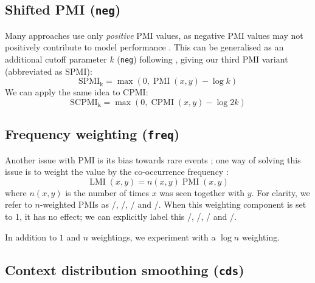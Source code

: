 \documentclass[11pt]{article}
\begin{document}


\subsection{Shifted PMI (\texttt{neg})}
\label{sec:shifted-pmi}

Many approaches use only \emph{positive} PMI values, as  negative PMI values may not positively contribute to model performance \cite{Turney:2010:FMV:1861751.1861756}. This can be generalised as an additional cutoff parameter $k$ (\texttt{neg}) following , giving our third PMI variant (abbreviated as SPMI):
%
\begin{equation}
  \label{eq:ppmi}
  \operatorname{SPMI_k} = \max (0, \operatorname{PMI}(x, y) - \log k)
\end{equation}
%
We can apply the same idea to CPMI:
%
\begin{equation}
  \label{eq:pcpmi}
  \operatorname{SCPMI_k} = \max (0, \operatorname{CPMI}(x, y) - \log 2k)
\end{equation}

\subsection{Frequency weighting (\texttt{freq})}
\label{sec:frequency-weighting}

Another issue with PMI is its bias towards rare events \cite{TACL570}; one way of solving this issue is to weight the value by the co-occurrence frequency \cite{Evert05}:
%
\begin{equation}
  \label{eq:lmi}
  \operatorname{LMI}(x, y) = n(x, y)\operatorname{PMI}(x, y)
\end{equation}
%
where $n(x, y)$ is the number of times $x$ was seen together with $y$. For clarity, we refer to $n$-weighted PMIs as \NPMI/, \NSPMI/, \NCPMI/ and \NSCPMI/. When this weighting component is set to 1, it has no effect; we can  explicitly label this \PMI/, \SPMI/, \CPMI/ and \SCPMI/.

In addition to $1$ and $n$ weightings, we experiment with a $\log n$ weighting.



\subsection{Context distribution smoothing (\texttt{cds})}
\label{sec:cont-distr-smooth}
\end{document}
